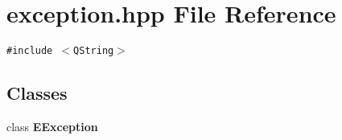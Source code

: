 \section{exception.hpp File Reference}
\label{exception_8hpp}
{\tt \#include $<$QString$>$}\par
\subsection*{Classes}
\begin{CompactItemize}
\item 
class {\bf EException}
\end{CompactItemize}
